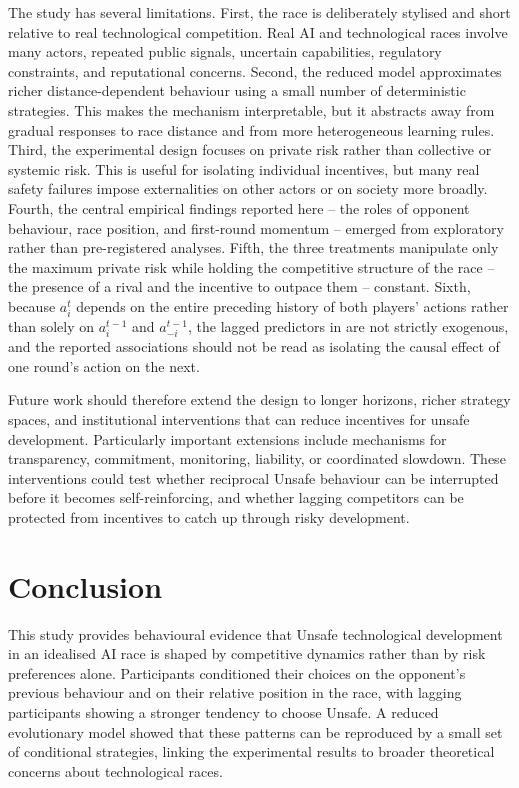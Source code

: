 \documentclass[pdflatex,sn-mathphys-ay]{sn-jnl}
\theoremstyle{thmstyleone}
\theoremstyle{thmstyletwo}
\theoremstyle{thmstylethree}
\begin{document}
The study has several limitations. First, the race is deliberately stylised and short relative to real technological competition. Real AI and technological races involve many actors, repeated public signals, uncertain capabilities, regulatory constraints, and reputational concerns. Second, the reduced model approximates richer distance-dependent behaviour using a small number of deterministic strategies. This makes the mechanism interpretable, but it abstracts away from gradual responses to race distance and from more heterogeneous learning rules. Third, the experimental design focuses on private risk rather than collective or systemic risk. This is useful for isolating individual incentives, but many real safety failures impose externalities on other actors or on society more broadly. Fourth, the central empirical findings reported here -- the roles of opponent behaviour, race position, and first-round momentum -- emerged from exploratory rather than pre-registered analyses. Fifth, the three treatments manipulate only the maximum private risk while holding the competitive structure of the race -- the presence of a rival and the incentive to outpace them -- constant. Sixth, because \(a_i^t\) depends on the entire preceding history of both players' actions rather than solely on \(a_i^{t-1}\) and \(a_{-i}^{t-1}\), the lagged predictors in  are not strictly exogenous, and the reported associations should not be read as isolating the causal effect of one round's action on the next.

Future work should therefore extend the design to longer horizons, richer strategy spaces, and institutional interventions that can reduce incentives for unsafe development. Particularly important extensions include mechanisms for transparency, commitment, monitoring, liability, or coordinated slowdown. These interventions could test whether reciprocal Unsafe behaviour can be interrupted before it becomes self-reinforcing, and whether lagging competitors can be protected from incentives to catch up through risky development.

\section{Conclusion}\label{sec:conclusion}

This study provides behavioural evidence that Unsafe technological development in an idealised AI race is shaped by competitive dynamics rather than by risk preferences alone. Participants conditioned their choices on the opponent's previous behaviour and on their relative position in the race, with lagging participants showing a stronger tendency to choose Unsafe. A reduced evolutionary model showed that these patterns can be reproduced by a small set of conditional strategies, linking the experimental results to broader theoretical concerns about technological races.
\end{document}
